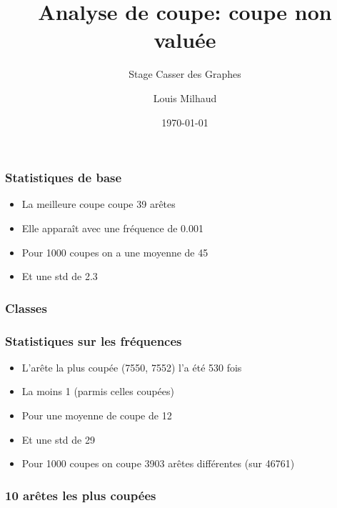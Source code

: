 \documentclass[aspectratio=169]{beamer}
\title{Analyse de coupe: coupe non valuée}
\subtitle{Stage Casser des Graphes}
\author{Louis Milhaud}
\institute{Complex Networks - LIP6}
\date{\today}
\begin{document}
    \begin{frame}
        \titlepage
    \end{frame}

    \begin{frame}
        \frametitle{Statistiques de base}
    
        \begin{itemize}
            \item La meilleure coupe coupe 39 arêtes
            \item Elle apparaît avec une fréquence de 0.001
            \item Pour 1000 coupes on a une moyenne de 45
            \item Et une std de 2.3
        \end{itemize}
    
    \end{frame}

    \begin{frame}
        \frametitle{Classes}
    
        
    
    \end{frame}

    \begin{frame}
        \frametitle{Statistiques sur les fréquences}
        
        \begin{itemize}
            \item L'arête la plus coupée (7550, 7552) l'a été 530 fois
            \item La moins 1 (parmis celles coupées)
            \item Pour une moyenne de coupe de 12
            \item Et une std de 29
            \item Pour 1000 coupes on coupe 3903 arêtes différentes (sur 46761)
        \end{itemize}
        
    \end{frame}

    \begin{frame}
        \frametitle{10 arêtes les plus coupées}
    
        
    
    \end{frame}
\end{document}
